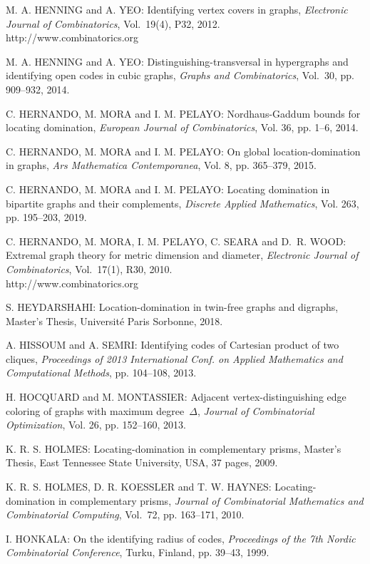 \begin{thebibliography}{999}
M. A. HENNING and A. YEO: Identifying vertex covers in graphs, {\it Electronic Journal of Combinatorics}, Vol.~19(4), P32, 2012.\\
http://www.combinatorics.org

M. A. HENNING and A. YEO: Distinguishing-transversal in hypergraphs and identifying open codes in cubic graphs, {\it Graphs and Combinatorics}, Vol.~30, pp. 909--932, 2014.

C. HERNANDO, M. MORA and I. M. PELAYO: Nordhaus-Gaddum bounds for locating domination, {\it European Journal of Combinatorics}, Vol. 36, pp. 1--6, 2014.

C. HERNANDO, M. MORA and I. M. PELAYO: On global location-domination in graphs, {\it Ars Mathematica Contemporanea}, Vol. 8, pp. 365--379, 2015.

C. HERNANDO, M. MORA and I. M. PELAYO: Locating domination in bipartite graphs and their complements, {\it Discrete Applied Mathematics}, Vol. 263, pp. 195--203, 2019.

C. HERNANDO, M. MORA, I. M. PELAYO, C. SEARA and D.~R. WOOD: Extremal graph theory for metric dimension and diameter, {\it Electronic Journal of Combinatorics}, Vol.~17(1), R30, 2010.\\
http://www.combinatorics.org

S. HEYDARSHAHI: Location-domination in twin-free graphs and digraphs, Master's Thesis, Universit\'e Paris Sorbonne, 2018.

A. HISSOUM and A. SEMRI: Identifying codes of Cartesian product of two cliques, {\it Proceedings of 2013 International Conf. on Applied Mathematics and Computational Methods}, pp. 104--108, 2013.

H. HOCQUARD and M. MONTASSIER: Adjacent vertex-distinguishing edge coloring of graphs with maximum degree~$\Delta$, {\it Journal of Combinatorial Optimization}, Vol. 26, pp. 152--160, 2013.

K. R. S. HOLMES: Locating-domination in complementary prisms, Master's Thesis, East Tennessee State University, USA, 37 pages, 2009.

K. R. S. HOLMES, D. R. KOESSLER and T. W. HAYNES: Locating-domination in
complementary prisms, {\it Journal of Combinatorial Mathematics and Combinatorial
Computing}, Vol.~72, pp. 163--171, 2010.

I. HONKALA: On the identifying radius of codes, {\it Proceedings of the 7th Nordic Combinatorial Conference}, Turku, Finland, pp. 39--43, 1999.


\end{thebibliography}
